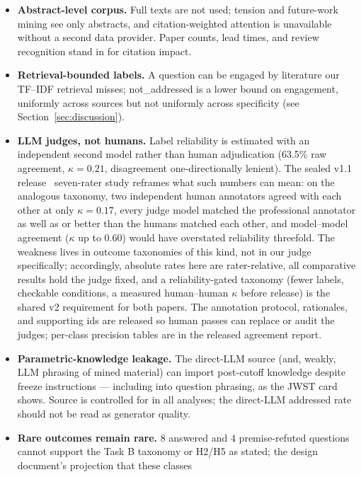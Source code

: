\documentclass[11pt]{article}
\begin{document}
\begin{itemize}
  \item \textbf{Abstract-level corpus.} Full texts are not used; tension
    and future-work mining see only abstracts, and citation-weighted
    attention is unavailable without a second data provider. Paper
    counts, lead times, and review recognition stand in for citation
    impact.
  \item \textbf{Retrieval-bounded labels.} A question can be engaged by
    literature our TF--IDF retrieval misses; not\_addressed is a lower
    bound on engagement, uniformly across sources but not uniformly
    across specificity (see Section~\ref{sec:discussion}).
  \item \textbf{LLM judges, not humans.} Label reliability is estimated
    with an independent second model rather than human adjudication
    (63.5\% raw agreement, $\kappa=0.21$, disagreement one-directionally
    lenient). The sealed v1.1 release~\cite{paper2} seven-rater study reframes what such
    numbers can mean: on the analogous taxonomy, two independent human
    annotators agreed with each other at only $\kappa=0.17$, every
    judge model matched the professional annotator as well as or better
    than the humans matched each other, and model--model agreement
    ($\kappa$ up to 0.60) would have overstated reliability threefold.
    The weakness lives in outcome taxonomies of this kind, not in our
    judge specifically; accordingly, absolute rates here are
    rater-relative, all comparative results hold the judge fixed, and a
    reliability-gated taxonomy (fewer labels, checkable conditions, a
    measured human--human $\kappa$ before release) is the shared v2
    requirement for both papers. The annotation protocol, rationales,
    and supporting ids are released so human passes can replace or
    audit the judges; per-class precision tables are in the released
    agreement report.
  \item \textbf{Parametric-knowledge leakage.} The direct-LLM source
    (and, weakly, LLM phrasing of mined material) can import post-cutoff
    knowledge despite freeze instructions --- including into question
    phrasing, as the JWST card shows. Source is controlled for in all
    analyses; the direct-LLM addressed rate should not be read as
    generator quality.
  \item \textbf{Rare outcomes remain rare.} 8 answered and 4
    premise-refuted questions cannot support the Task B taxonomy or
    H2/H5 as stated; the design document's projection that these classes

\end{itemize}
\end{document}
